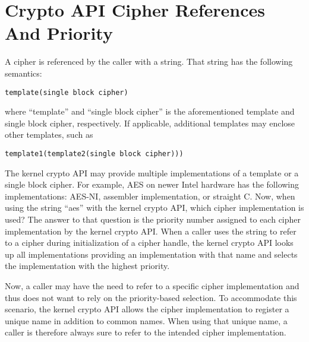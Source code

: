 \documentclass[a4paper,8pt,english]{sphinxmanual}
\begin{document}
\section{Crypto API Cipher References And Priority}
\label{crypto/architecture:crypto-api-cipher-references-and-priority}
A cipher is referenced by the caller with a string. That string has the
following semantics:

\begin{Verbatim}[commandchars=\\\{\}]
template(single block cipher)
\end{Verbatim}

where ``template'' and ``single block cipher'' is the aforementioned
template and single block cipher, respectively. If applicable,
additional templates may enclose other templates, such as

\begin{Verbatim}[commandchars=\\\{\}]
template1(template2(single block cipher)))
\end{Verbatim}

The kernel crypto API may provide multiple implementations of a template
or a single block cipher. For example, AES on newer Intel hardware has
the following implementations: AES-NI, assembler implementation, or
straight C. Now, when using the string ``aes'' with the kernel crypto API,
which cipher implementation is used? The answer to that question is the
priority number assigned to each cipher implementation by the kernel
crypto API. When a caller uses the string to refer to a cipher during
initialization of a cipher handle, the kernel crypto API looks up all
implementations providing an implementation with that name and selects
the implementation with the highest priority.

Now, a caller may have the need to refer to a specific cipher
implementation and thus does not want to rely on the priority-based
selection. To accommodate this scenario, the kernel crypto API allows
the cipher implementation to register a unique name in addition to
common names. When using that unique name, a caller is therefore always
sure to refer to the intended cipher implementation.
\end{document}

